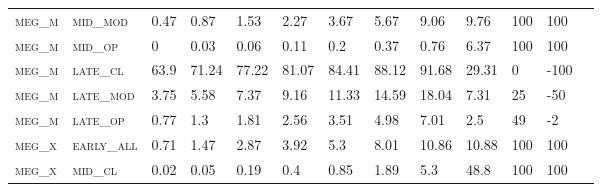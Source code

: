 \begin{landscape}
\begin{table}[!htbp]
\begin{tabular}{@{}lllllllllllll@{}}
\footnotesize \textsc{meg\_m}      & \footnotesize \textsc{mid\_mod  }                & \footnotesize 0.47            & \footnotesize 0.87            & \footnotesize 1.53             & \footnotesize 2.27             & \footnotesize 3.67             & \footnotesize 5.67             & \footnotesize 9.06       & \footnotesize 9.76     & \footnotesize 100    & \footnotesize 100      \\
\footnotesize \textsc{meg\_m}      & \footnotesize \textsc{mid\_op   }                & \footnotesize 0               & \footnotesize 0.03            & \footnotesize 0.06             & \footnotesize 0.11             & \footnotesize 0.2              & \footnotesize 0.37             & \footnotesize 0.76       & \footnotesize 6.37     & \footnotesize 100    & \footnotesize 100      \\
\footnotesize \textsc{meg\_m}      & \footnotesize \textsc{late\_cl  }                & \footnotesize 63.9            & \footnotesize 71.24           & \footnotesize 77.22            & \footnotesize 81.07            & \footnotesize 84.41            & \footnotesize 88.12            & \footnotesize 91.68      & \footnotesize 29.31    & \footnotesize 0      & \footnotesize -100     \\
\footnotesize \textsc{meg\_m}      & \footnotesize \textsc{late\_mod }                & \footnotesize 3.75            & \footnotesize 5.58            & \footnotesize 7.37             & \footnotesize 9.16             & \footnotesize 11.33            & \footnotesize 14.59            & \footnotesize 18.04      & \footnotesize 7.31     & \footnotesize 25     & \footnotesize -50      \\
\footnotesize \textsc{meg\_m}      & \footnotesize \textsc{late\_op  }                & \footnotesize 0.77            & \footnotesize 1.3             & \footnotesize 1.81             & \footnotesize 2.56             & \footnotesize 3.51             & \footnotesize 4.98             & \footnotesize 7.01       & \footnotesize 2.5      & \footnotesize 49     & \footnotesize -2       \\
\footnotesize \textsc{meg\_x}      & \footnotesize \textsc{early\_all}                & \footnotesize 0.71            & \footnotesize 1.47            & \footnotesize 2.87             & \footnotesize 3.92             & \footnotesize 5.3              & \footnotesize 8.01             & \footnotesize 10.86      & \footnotesize 10.88    & \footnotesize 100    & \footnotesize 100      \\
\footnotesize \textsc{meg\_x}      & \footnotesize \textsc{mid\_cl   }                & \footnotesize 0.02            & \footnotesize 0.05            & \footnotesize 0.19             & \footnotesize 0.4              & \footnotesize 0.85             & \footnotesize 1.89             & \footnotesize 5.3        & \footnotesize 48.8     & \footnotesize 100    & \footnotesize 100      \\

\end{tabular}
\end{table}
\end{landscape}
